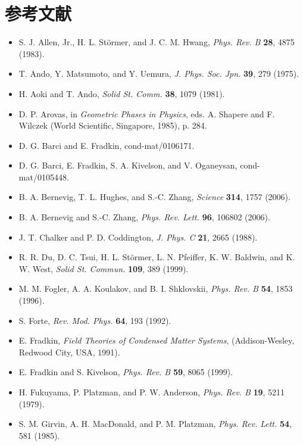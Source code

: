 \section*{参考文献}

\begin{itemize}[leftmargin=2em,itemsep=0pt,parsep=0pt,label={}]
\item [ASH1983] S. J. Allen, Jr., H. L. Störmer, and J. C. M. Hwang, \emph{Phys. Rev. B} \textbf{28}, 4875 (1983).
\item [AMY1975] T. Ando, Y. Matsumoto, and Y. Uemura, \emph{J. Phys. Soc. Jpn.} \textbf{39}, 279 (1975).
\item [AA1981] H. Aoki and T. Ando, \emph{Solid St. Comm.} \textbf{38}, 1079 (1981).
\item [A1985] D. P. Arovas, in \emph{Geometric Phases in Physics}, eds. A. Shapere and F. Wilczek (World Scientific, Singapore, 1985), p. 284.
\item [BF2001] D. G. Barci and E. Fradkin, cond-mat/0106171.
\item [B2001] D. G. Barci, E. Fradkin, S. A. Kivelson, and V. Oganeysan, cond-mat/0105448.
\item [BHZ2006] B. A. Bernevig, T. L. Hughes, and S.-C. Zhang, \emph{Science} \textbf{314}, 1757 (2006).
\item [BZ2006] B. A. Bernevig and S.-C. Zhang, \emph{Phys. Rev. Lett.} \textbf{96}, 106802 (2006).
\item [CC1988] J. T. Chalker and P. D. Coddington, \emph{J. Phys. C} \textbf{21}, 2665 (1988).
\item [D1999] R. R. Du, D. C. Tsui, H. L. Störmer, L. N. Pfeiffer, K. W. Baldwin, and K. W. West, \emph{Solid St. Commun.} \textbf{109}, 389 (1999).
\item [FKS1996] M. M. Fogler, A. A. Koulakov, and B. I. Shklovskii, \emph{Phys. Rev. B} \textbf{54}, 1853 (1996).
\item [F1992] S. Forte, \emph{Rev. Mod. Phys.} \textbf{64}, 193 (1992).
\item [F1991] E. Fradkin, \emph{Field Theories of Condensed Matter Systems}, (Addison-Wesley, Redwood City, USA, 1991).
\item [FK1999] E. Fradkin and S. Kivelson, \emph{Phys. Rev. B} \textbf{59}, 8065 (1999).
\item [FPA1979] H. Fukuyama, P. Platzman, and P. W. Anderson, \emph{Phys. Rev. B} \textbf{19}, 5211 (1979).
\item [GMP1985] S. M. Girvin, A. H. MacDonald, and P. M. Platzman, \emph{Phys. Rev. Lett.} \textbf{54}, 581 (1985).

\end{itemize}

